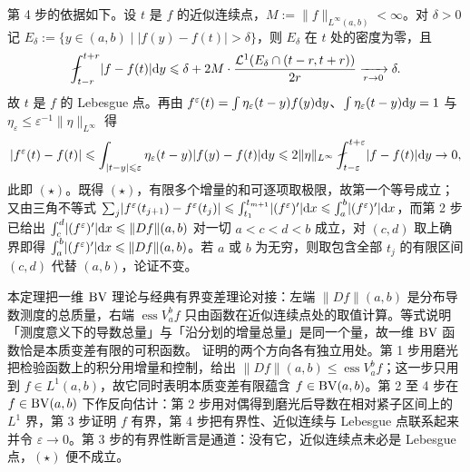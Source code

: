 \documentclass[../../main.tex]{subfiles}%
\begin{document}
第 4 步的依据如下。设 $t$ 是 $f$ 的近似连续点，$M:=\lVert f\rVert_{L^\infty(a,b)}<\infty$。对 $\delta>0$ 记 $E_\delta:=\{y\in(a,b)\mid\lvert f(y)-f(t)\rvert>\delta\}$，则 $E_\delta$ 在 $t$ 处的密度为零，且
\begin{align*}
\fint_{t-r}^{t+r}\lvert f-f(t)\rvert\diff y\leqslant\delta+2M\cdot\frac{\mathcal{L}^1(E_\delta\cap(t-r,t+r))}{2r}\xrightarrow[r\to0]{}\delta .
\end{align*}
故 $t$ 是 $f$ 的 Lebesgue 点。再由 $f^\varepsilon(t)=\int\eta_\varepsilon(t-y)f(y)\mathrm{d} y$、$\int\eta_\varepsilon(t-y)\mathrm{d} y=1$ 与 $\eta_\varepsilon\leqslant\varepsilon^{-1}\lVert\eta\rVert_{L^\infty}$ 得
\begin{align*}
\lvert f^\varepsilon(t)-f(t)\rvert\leqslant\int_{\lvert t-y\rvert\leqslant\varepsilon}\eta_\varepsilon(t-y)\lvert f(y)-f(t)\rvert\diff y\leqslant2\lVert\eta\rVert_{L^\infty}\fint_{t-\varepsilon}^{t+\varepsilon}\lvert f-f(t)\rvert\diff y\to0,
\end{align*}
此即 $(\star)$。既得 $(\star)$，有限多个增量的和可逐项取极限，故第一个等号成立；又由三角不等式 $\sum_j\lvert f^\varepsilon(t_{j+1})-f^\varepsilon(t_j)\rvert\leqslant\int_{t_1}^{t_{m+1}}\lvert(f^\varepsilon)'\rvert\mathrm{d} x\leqslant\int_a^b\lvert(f^\varepsilon)'\rvert\mathrm{d} x$，而第 2 步已给出 $\int_c^d\lvert(f^\varepsilon)'\rvert\mathrm{d} x\leqslant\lVert Df\rVert(a,b)$ 对一切 $a<c<d<b$ 成立，对 $(c,d)$ 取上确界即得 $\int_a^b\lvert(f^\varepsilon)'\rvert\mathrm{d} x\leqslant\lVert Df\rVert(a,b)$。若 $a$ 或 $b$ 为无穷，则取包含全部 $t_j$ 的有限区间 $(c,d)$ 代替 $(a,b)$，论证不变。

\begin{remark}\label{remark:ch05-thm-5-21-动机}
本定理把一维 $\mathrm{BV}$ 理论与经典有界变差理论对接：左端 $\lVert Df\rVert(a,b)$ 是分布导数测度的总质量，右端 $\operatorname{ess}V_a^b f$ 只由函数在近似连续点处的取值计算。等式说明「测度意义下的导数总量」与「沿分划的增量总量」是同一个量，故一维 $\mathrm{BV}$ 函数恰是本质变差有限的可积函数。
证明的两个方向各有独立用处。第 1 步用磨光把检验函数上的积分用增量和控制，给出 $\lVert Df\rVert(a,b)\leqslant\operatorname{ess}V_a^b f$；这一步只用到 $f\in L^1(a,b)$，故它同时表明本质变差有限蕴含 $f\in\mathrm{BV}(a,b)$。第 2 至 4 步在 $f\in\mathrm{BV}(a,b)$ 下作反向估计：第 2 步用对偶得到磨光后导数在相对紧子区间上的 $L^1$ 界，第 3 步证明 $f$ 有界，第 4 步把有界性、近似连续与 Lebesgue 点联系起来并令 $\varepsilon\to0$。第 3 步的有界性断言是通道：没有它，近似连续点未必是 Lebesgue 点，$(\star)$ 便不成立。
\end{remark}
\end{document}
